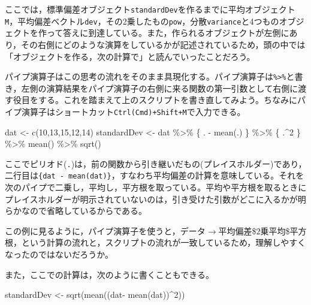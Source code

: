 \documentclass[
  a4paper,
]{ltjsbook}
\newenvironment{Shaded}{\begin{snugshade}}{\end{snugshade}}
\newcommand{\DecValTok}[1]{\textcolor[rgb]{0.68,0.00,0.00}{#1}}
\newcommand{\FunctionTok}[1]{\textcolor[rgb]{0.28,0.35,0.67}{#1}}
\newcommand{\NormalTok}[1]{\textcolor[rgb]{0.00,0.23,0.31}{#1}}
\newcommand{\OtherTok}[1]{\textcolor[rgb]{0.00,0.23,0.31}{#1}}
\newcommand{\SpecialCharTok}[1]{\textcolor[rgb]{0.37,0.37,0.37}{#1}}
\begin{document}
ここでは，標準偏差オブジェクト\texttt{standardDev}を作るまでに平均オブジェクト\texttt{M}，平均偏差ベクトル\texttt{dev}，その2乗したもの\texttt{pow}，分散\texttt{variance}と4つものオブジェクトを作って答えに到達している。また，作られるオブジェクトが左側にあり，その右側にどのような演算をしているかが記述されているため，頭の中では「オブジェクトを作る，次の計算で」と読んでいったことだろう。

パイプ演算子はこの思考の流れをそのまま具現化する。パイプ演算子は\texttt{\%\textgreater{}\%}と書き，左側の演算結果をパイプ演算子の右側に来る関数の第一引数として右側に渡す役目をする。これを踏まえて上のスクリプトを書き直してみよう。ちなみにパイプ演算子はショートカット\texttt{Ctrl(Cmd)+Shift+M}で入力できる。

\begin{Shaded}
\begin{Highlighting}[]
\NormalTok{dat }\OtherTok{\textless{}{-}} \FunctionTok{c}\NormalTok{(}\DecValTok{10}\NormalTok{,}\DecValTok{13}\NormalTok{,}\DecValTok{15}\NormalTok{,}\DecValTok{12}\NormalTok{,}\DecValTok{14}\NormalTok{) }
\NormalTok{standardDev }\OtherTok{\textless{}{-}}\NormalTok{ dat }\SpecialCharTok{\%\textgreater{}\%}
\NormalTok{  \{ . }\SpecialCharTok{{-}} \FunctionTok{mean}\NormalTok{(.) \} }\SpecialCharTok{\%\textgreater{}\%}
\NormalTok{  \{ .}\SpecialCharTok{\^{}}\DecValTok{2}\NormalTok{ \} }\SpecialCharTok{\%\textgreater{}\%}
  \FunctionTok{mean}\NormalTok{() }\SpecialCharTok{\%\textgreater{}\%}
  \FunctionTok{sqrt}\NormalTok{()}
\end{Highlighting}
\end{Shaded}

ここでピリオド(\texttt{.})は，前の関数から引き継いだもの(プレイスホルダー)であり，二行目は\texttt{\{dat\ -\ mean(dat)\}}，すなわち平均偏差の計算を意味している。それを次のパイプで二乗し，平均し，平方根を取っている。平均や平方根を取るときにプレイスホルダーが明示されていないのは，引き受けた引数がどこに入るかが明らかなので省略しているからである。

この例に見るように，パイプ演算子を使うと，データ\(\to\)平均偏差\$\to\(2乗\)\to\(平均\)\to\$平方根，という計算の流れと，スクリプトの流れが一致しているため，理解しやすくなったのではないだろうか。

また，ここでの計算は，次のように書くこともできる。

\begin{Shaded}
\begin{Highlighting}[]
\NormalTok{standardDev }\OtherTok{\textless{}{-}} \FunctionTok{sqrt}\NormalTok{(}\FunctionTok{mean}\NormalTok{((dat}\SpecialCharTok{{-}} \FunctionTok{mean}\NormalTok{(dat))}\SpecialCharTok{\^{}}\DecValTok{2}\NormalTok{))}
\end{Highlighting}
\end{Shaded}
\end{document}
